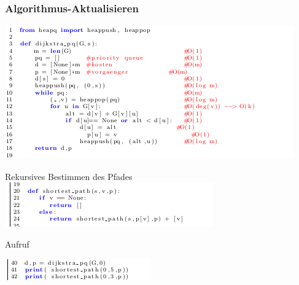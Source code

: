 \begin{frame}
	\frametitle{Algorithmus-Aktualisieren}
	\centering
	\includegraphics[scale=0.8]{./pictures/Relaxieren.png}
\end{frame}


\begin{frame}
	\begin{block} {Rekursives Bestimmen des Pfades}
		\vspace{3mm}
		\hspace{10mm}
		\includegraphics[scale=0.8]{./pictures/RekPfad.png}
	\end{block}
	\begin{block} {Aufruf}
	
		\hspace{11mm}
		\includegraphics[scale=0.8]{./pictures/Aufruf.png}
	\end{block}
	
\end{frame}


			

